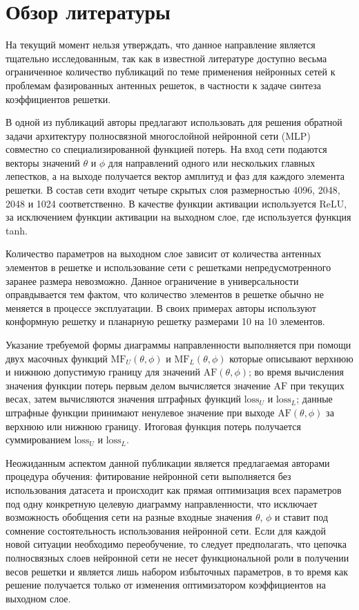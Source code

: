 \documentclass[nonacm, sigconf]{acmart}
\begin{document}
\section{Обзор литературы}

На текущий момент нельзя утверждать, что данное направление является тщательно исследованным, так как в известной литературе доступно весьма ограниченное количество публикаций по теме применения нейронных сетей к проблемам фазированных антенных решеток, в частности к задаче синтеза коэффициентов решетки.

В одной из публикаций \cite{mlp1} авторы предлагают использовать для решения обратной задачи архитектуру полносвязной многослойной нейронной сети (MLP) совместно со специализированной функцией потерь. На вход сети подаются векторы значений $\theta$ и $\phi$ для направлений одного или нескольких главных лепестков, а на выходе получается вектор амплитуд и фаз для каждого элемента решетки. В состав сети входит четыре скрытых слоя размерностью 4096, 2048, 2048 и 1024 соответственно. В качестве функции активации используется ReLU, за исключением функции активации на выходном слое, где используется функция tanh.

Количество параметров на выходном слое зависит от количества антенных элементов в решетке и использование сети с решетками непредусмотренного заранее размера невозможно. Данное ограничение в универсальности оправдывается тем фактом, что количество элементов в решетке обычно не меняется в процессе эксплуатации. В своих примерах авторы используют конформную решетку и планарную решетку размерами 10 на 10 элементов.

Указание требуемой формы диаграммы направленности выполняется при помощи двух масочных функций $\text{MF}_U(\theta, \phi)$ и $\text{MF}_L(\theta, \phi)$ которые описывают верхнюю и нижнюю допустимую границу для значений $\text{AF}(\theta, \phi)$; во время вычисления значения функции потерь первым делом вычисляется значение $\text{AF}$ при текущих весах, затем вычисляются значения штрафных функций $\text{loss}_U$ и $\text{loss}_L$; данные штрафные функции принимают ненулевое значение при выходе $\text{AF}(\theta, \phi)$ за верхнюю или нижнюю границу. Итоговая функция потерь получается суммированием $\text{loss}_U$ и $\text{loss}_L$.

Неожиданным аспектом данной публикации является предлагаемая авторами процедура обучения: фитирование нейронной сети выполняется без использования датасета и происходит как прямая оптимизация всех параметров под одну конкретную целевую диаграмму направленности, что исключает возможность обобщения сети на разные входные значения $\theta$, $\phi$ и ставит под сомнение состоятельность использования нейронной сети. Если для каждой новой ситуации необходимо переобучение, то следует предполагать, что цепочка полносвязных слоев нейронной сети не несет функциональной роли в получении весов решетки и является лишь набором избыточных параметров, в то время как решение получается только от изменения оптимизатором коэффициентов на выходном слое.
\end{document}
